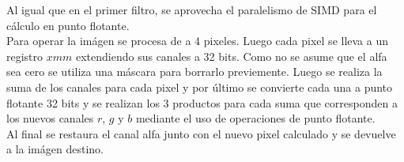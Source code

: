 Al igual que en el primer filtro, se aprovecha el paralelismo de SIMD para el cálculo en punto flotante.\\

Para operar la imágen se procesa de a 4 pixeles. Luego cada pixel se lleva a un registro $xmm$ extendiendo sus canales a 32 bits. Como no se asume que el alfa sea cero se utiliza una máscara para borrarlo previemente. Luego se realiza la suma de los canales para cada pixel y por último se convierte cada una a punto flotante 32 bits y se realizan los 3 productos para cada suma que corresponden a los nuevos canales $r$, $g$ y $b$ mediante el uso de operaciones de punto flotante.\\

Al final se restaura el canal alfa junto con el nuevo pixel calculado y se devuelve a la imágen destino. 

